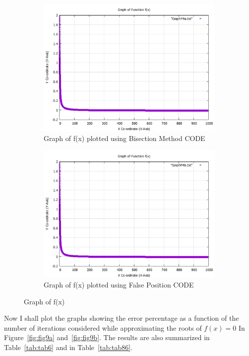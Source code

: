 \documentclass[titlepage, 11pt]{article}
\begin{document}
\begin{figure}
\begin{subfigure}{.5\textwidth}
  \centering
  \includegraphics[width=\linewidth]{GraphP4a.pdf}
  \caption{Graph of f(x) plotted using Bisection Method CODE}
  \label{fig:fig8a}
\end{subfigure}
\begin{subfigure}{.5\textwidth}
  \centering
  \includegraphics[width=\linewidth]{GraphP4b.pdf}
  \caption{Graph of f(x) plotted using False Position CODE}
  \label{fig:fig8b}
\end{subfigure}
\caption{Graph of f(x)}
\label{fig:Graph4}
\end{figure}

Now I shall plot the graphs showing the error percentage as a function of the number of iterations considered while approximating the roots of $f(x)=0$ In Figure~\ref{fig:fig9a} and~\ref{fig:fig9b}. The results are also summarized in Table~\ref{tab:tab6} and in Table~\ref{tab:tab86}.
\end{document}
